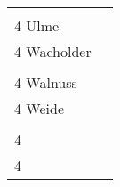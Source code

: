 \documentclass{article}\usepackage[ngerman]{babel}\usepackage{geometry}\usepackage{lmodern}
\begin{document}
\begin{table}[p]
  \begin{tabular}{ll}    \hspace{-2em}    \fbox{\begin{minipage}[t][6cm][t]{8cm}
        \fontsize{45}{54} \selectfont
        \phantom{ }\\
      \phantom{ }4 Ulme    \end{minipage}}
    &
\fbox{\begin{minipage}[t][6cm][t]{8cm}
        \fontsize{45}{54} \selectfont
        \phantom{ }\\
        \phantom{ } 4 Wacholder      \end{minipage}}\\    \hspace{-2em}    \fbox{\begin{minipage}[t][6cm][t]{8cm}
        \fontsize{45}{54} \selectfont
        \phantom{ }\\
      \phantom{ }4 Walnuss    \end{minipage}}
    &
\fbox{\begin{minipage}[t][6cm][t]{8cm}
        \fontsize{45}{54} \selectfont
        \phantom{ }\\
        \phantom{ } 4 Weide      \end{minipage}}\\    \hspace{-2em}    \fbox{\begin{minipage}[t][6cm][t]{8cm}
        \fontsize{45}{54} \selectfont
        \phantom{ }\\
      \phantom{ }4      \end{minipage}}
    &
\fbox{\begin{minipage}[t][6cm][t]{8cm}
        \fontsize{45}{54} \selectfont
        \phantom{ }\\
        \phantom{ } 4        \end{minipage}}\\\end{tabular}
\end{table}
\end{document}
